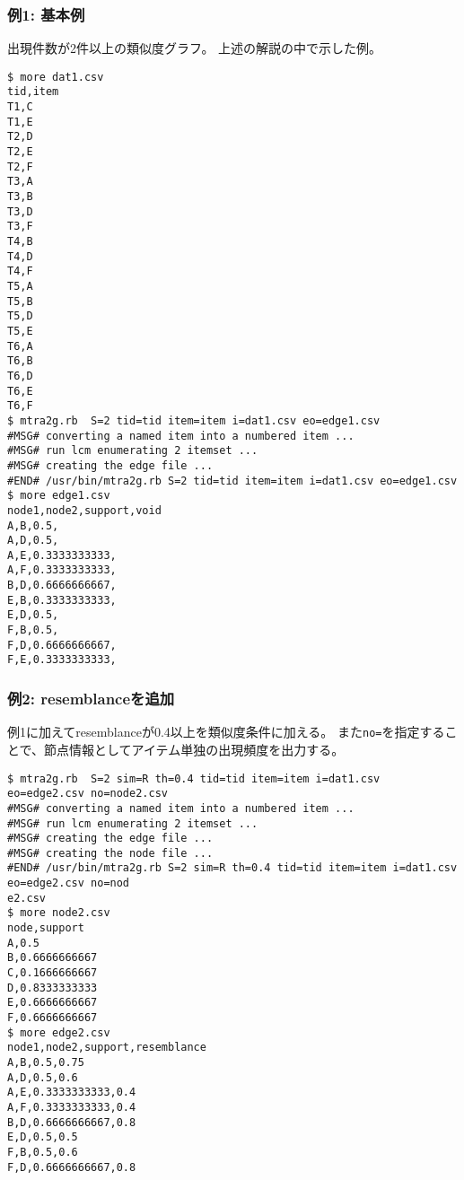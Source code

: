 \subsubsection*{例1: 基本例}

出現件数が2件以上の類似度グラフ。
上述の解説の中で示した例。


\begin{Verbatim}[baselinestretch=0.7,frame=single]
$ more dat1.csv
tid,item
T1,C
T1,E
T2,D
T2,E
T2,F
T3,A
T3,B
T3,D
T3,F
T4,B
T4,D
T4,F
T5,A
T5,B
T5,D
T5,E
T6,A
T6,B
T6,D
T6,E
T6,F
$ mtra2g.rb  S=2 tid=tid item=item i=dat1.csv eo=edge1.csv
#MSG# converting a named item into a numbered item ...
#MSG# run lcm enumerating 2 itemset ...
#MSG# creating the edge file ...
#END# /usr/bin/mtra2g.rb S=2 tid=tid item=item i=dat1.csv eo=edge1.csv
$ more edge1.csv
node1,node2,support,void
A,B,0.5,
A,D,0.5,
A,E,0.3333333333,
A,F,0.3333333333,
B,D,0.6666666667,
E,B,0.3333333333,
E,D,0.5,
F,B,0.5,
F,D,0.6666666667,
F,E,0.3333333333,
\end{Verbatim}
\subsubsection*{例2: resemblanceを追加}

例1に加えてresemblanceが0.4以上を類似度条件に加える。
また\verb|no=|を指定することで、節点情報としてアイテム単独の出現頻度を出力する。


\begin{Verbatim}[baselinestretch=0.7,frame=single]
$ mtra2g.rb  S=2 sim=R th=0.4 tid=tid item=item i=dat1.csv eo=edge2.csv no=node2.csv
#MSG# converting a named item into a numbered item ...
#MSG# run lcm enumerating 2 itemset ...
#MSG# creating the edge file ...
#MSG# creating the node file ...
#END# /usr/bin/mtra2g.rb S=2 sim=R th=0.4 tid=tid item=item i=dat1.csv eo=edge2.csv no=nod
e2.csv
$ more node2.csv
node,support
A,0.5
B,0.6666666667
C,0.1666666667
D,0.8333333333
E,0.6666666667
F,0.6666666667
$ more edge2.csv
node1,node2,support,resemblance
A,B,0.5,0.75
A,D,0.5,0.6
A,E,0.3333333333,0.4
A,F,0.3333333333,0.4
B,D,0.6666666667,0.8
E,D,0.5,0.5
F,B,0.5,0.6
F,D,0.6666666667,0.8
\end{Verbatim}
